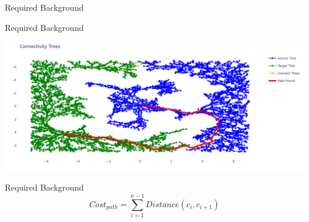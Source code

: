 \begin{frame}[fragile]{Required Background} 
  \begin{center}
  \end{center}
\end{frame}

\begin{frame}[fragile]{Required Background} 
  \begin{center}
  \includegraphics[width=1.0\textwidth]{figures/required_background/rrt/rrt67}
  \end{center}
\end{frame}





\begin{frame}[fragile]{Required Background} 
\[\mathit{Cost_{path}} = \sum_{i=1}^{n-1} \mathit{Distance}(c_i, c_{i+1})\]
\end{frame}


